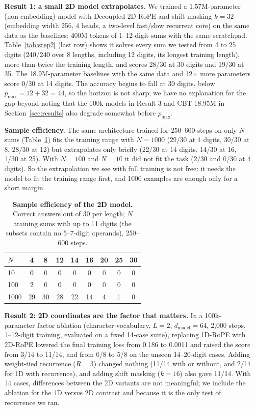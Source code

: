 \documentclass[10pt,twocolumn]{article}
\begin{document}
\textbf{Result 1: a small 2D model extrapolates.} We trained a 1.57M-parameter (non-embedding) model with Decoupled 2D-RoPE and shift masking $k=32$ (embedding width 256, 4 heads, a two-level fast/slow recurrent core) on the same data as the baselines: 400M tokens of 1--12-digit sums with the same scratchpad. Table~\ref{tab:step2} (last row) shows it solves every sum we tested from 4 to 25 digits (240/240 over 8 lengths, including 12 digits, its longest training length), more than twice the training length, and scores 28/30 at 30 digits and 19/30 at 35. The 18.9M-parameter baselines with the same data and 12$\times$ more parameters score 0/30 at 14 digits. The accuracy begins to fall at 30 digits, below $p_{\max} = 12 + 32 = 44$, so the horizon is not sharp; we have no explanation for the gap beyond noting that the 100k models in Result 3 and CBT-18.95M in Section~\ref{sec:results} also degrade somewhat before $p_{\max}$.

\textbf{Sample efficiency.} The same architecture trained for 250--600 steps on only $N$ sums (Table~\ref{tab:sampleeff}) fits the training range with $N=1000$ (29/30 at 4 digits, 30/30 at 8, 28/30 at 12) but extrapolates only briefly (22/30 at 14 digits, 14/30 at 16, 1/30 at 25). With $N=100$ and $N=10$ it did not fit the task (2/30 and 0/30 at 4 digits). So the extrapolation we see with full training is not free: it needs the model to fit the training range first, and 1000 examples are enough only for a short margin.

\begin{table}[!t]
\centering
\footnotesize
\setlength{\tabcolsep}{3.2pt}
\caption{\textbf{Sample efficiency of the 2D model.} Correct answers out of 30 per length; $N$ training sums with up to 11 digits (the subsets contain no 5--7-digit operands), 250--600 steps.}\label{tab:sampleeff}
\begin{tabular}{@{}lcccccccc@{}}
\toprule
$N$ & 4 & 8 & 12 & 14 & 16 & 20 & 25 & 30 \\
\midrule
10 & 0 & 0 & 0 & 0 & 0 & 0 & 0 & 0 \\
100 & 2 & 0 & 0 & 0 & 0 & 0 & 0 & 0 \\
1000 & 29 & 30 & 28 & 22 & 14 & 4 & 1 & 0 \\
\bottomrule
\end{tabular}
\end{table}

\textbf{Result 2: 2D coordinates are the factor that matters.} In a 100k-parameter factor ablation (character vocabulary, $L=2$, $d_{\text{model}}=64$, 2,000 steps, 1--12-digit training, evaluated on a fixed 14-case suite), replacing 1D-RoPE with 2D-RoPE lowered the final training loss from 0.186 to 0.0011 and raised the score from 3/14 to 11/14, and from 0/8 to 5/8 on the unseen 14--20-digit cases. Adding weight-tied recurrence ($R=3$) changed nothing (11/14 with or without, and 2/14 for 1D with recurrence), and adding shift masking ($k=16$) also gave 11/14. With 14 cases, differences between the 2D variants are not meaningful; we include the ablation for the 1D versus 2D contrast and because it is the only test of recurrence we ran.
\end{document}
